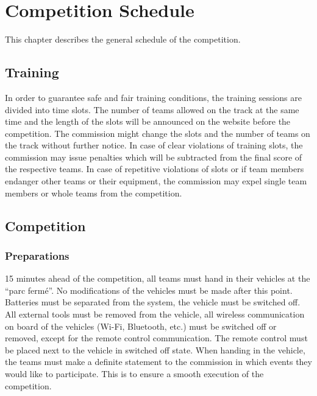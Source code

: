 \chapter{Competition Schedule}

This chapter describes the general schedule of the competition.

\section{Training}

In order to guarantee safe and fair training conditions, the training sessions
are divided into time slots. The number of teams allowed on the track at the
same time and the length of the slots will be announced on the website before
the competition. The commission might change the slots and the number of teams
on the track without further notice. In case of clear violations of training
slots, the commission may issue penalties which will be subtracted from the
final score of the respective teams. In case of repetitive violations of slots
or if team members endanger other teams or their equipment, the commission may
expel single team members or whole teams from the competition.



\section{Competition}
\subsection{Preparations}

15 minutes ahead of the competition, all teams must hand in their vehicles at the “parc fermé”. No modifications of the vehicles must be made after this point. Batteries must be separated from the system, the vehicle must be switched off. All external tools must be removed from the vehicle, all wireless communication on board of the vehicles (Wi-Fi, Bluetooth, etc.) must be switched off or removed, except for the remote control communication. The remote control must be placed next to the vehicle in switched off state. When handing in the vehicle, the teams must make a definite statement to the commission in which events they would like to participate. This is to ensure a smooth execution of the competition.

